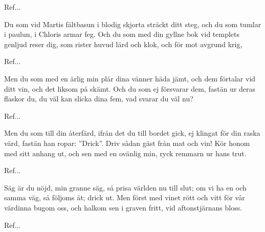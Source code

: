 \begin{SongText}
\begin{SongVerse}
Ref...
\end{SongVerse}
\begin{SongVerse}
Du som vid Martis fältbasun
i blodig skjorta sträckt ditt steg,
och du som tumlar i paulun,
i Chloris armar feg.
Och du som med din gyllne bok
vid templets genljud reser dig,
som rister huvud lärd och klok,
och för mot avgrund krig,
\end{SongVerse}
\begin{SongVerse}
Ref...
\end{SongVerse}
\begin{SongVerse}
Men du som med en ärlig min
plär dina vänner häda jämt,
och dem förtalar vid ditt vin,
och det liksom på skämt.
Och du som ej försvarar dem,
fastän ur deras flaskor du,
du väl kan slicka dina fem,
vad svarar du väl nu?
\end{SongVerse}
\begin{SongVerse}
Ref...
\end{SongVerse}
\begin{SongVerse}
Men du som till din återfärd,
ifrån det du till bordet gick,
ej klingat för din raska värd,
fastän han ropar: ”Drick”.
Driv sådan gäst från mat och vin!
Kör honom med sitt anhang ut,
och sen med en ovänlig min,
ryck remmarn ur hans trut.
\end{SongVerse}
\begin{SongVerse}
Ref...
\end{SongVerse}
\begin{SongVerse}
Säg är du nöjd, min granne säg,
så prisa världen nu till slut;
om vi ha en och samma väg,
så följoms åt; drick ut.
Men först med vinet rött och vitt
för vår värdinna bugom oss,
och halkom sen i graven fritt,
vid aftonstjärnans bloss.
\end{SongVerse}
\begin{SongVerse}
Ref... 
\end{SongVerse}
\end{SongText}
